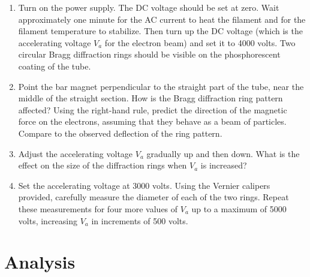 \begin{enumerate}
\item Turn on the power supply. The DC voltage should be set at zero.  Wait
  approximately one minute for the AC current to heat the filament and for the
  filament temperature to stabilize.  Then turn up the DC voltage (which is the
  accelerating voltage $V_a$ for the electron beam) and set it to 4000 volts.
  Two circular Bragg diffraction rings should be visible on the phosphorescent
  coating of the tube.

\item Point the bar magnet perpendicular to the straight part of the tube, near
  the middle of the straight section.  How is the Bragg diffraction ring pattern
  affected?  Using the right-hand rule, predict the direction of the magnetic
  force on the electrons, assuming that they behave as a beam of particles.
  Compare to the observed deflection of the ring pattern.

\item Adjust the accelerating voltage $V_a$ gradually up and then down.  What is
  the effect on the size of the diffraction rings when $V_a$ is
  increased?

\item Set the accelerating voltage at 3000 volts.  Using the Vernier calipers
  provided, carefully measure the diameter of each of the two rings.  Repeat
  these measurements for four more values of $V_a$ up to a maximum of 5000
  volts, increasing $V_a$ in increments of 500 volts.
\end{enumerate}

\section{Analysis}

